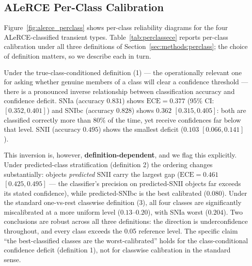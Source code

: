 \subsection{ALeRCE Per-Class Calibration}
\label{sec:results:alerce_perclass}

Figure~\ref{fig:alerce_perclass} shows per-class reliability diagrams
for the four ALeRCE-classified transient types.
Table~\ref{tab:perclassece} reports per-class calibration under all
three definitions of Section~\ref{sec:methods:perclass}; the choice
of definition matters, so we describe each in turn.

Under the true-class-conditioned definition (1) — the operationally
relevant one for asking whether genuine members of a class will clear
a confidence threshold — there is a pronounced inverse relationship
between classification accuracy and confidence deficit. SNIa
(accuracy $0.831$) shows $\mathrm{ECE} = 0.377$
(95\% CI: $[0.352, 0.401]$) and SNIbc (accuracy $0.828$) shows
$0.362$ $[0.315, 0.405]$: both are classified correctly more than
80\% of the time, yet receive confidences far below that level. SNII
(accuracy $0.495$) shows the smallest deficit
($0.103$ $[0.066, 0.141]$).

This inversion is, however, \textbf{definition-dependent}, and we
flag this explicitly. Under predicted-class stratification
(definition 2) the ordering changes substantially: objects
\emph{predicted} SNII carry the largest gap
($\mathrm{ECE} = 0.461$ $[0.425, 0.495]$ — the classifier's precision
on predicted-SNII objects far exceeds its stated confidence), while
predicted-SNIbc is the best calibrated ($0.080$). Under the standard
one-vs-rest classwise definition (3), all four classes are
significantly miscalibrated at a more uniform level
($0.13$--$0.20$), with SNIa worst ($0.204$). Two conclusions are
robust across all three definitions: the direction is
underconfidence throughout, and every class exceeds the 0.05
reference level. The specific claim ``the best-classified classes
are the worst-calibrated'' holds for the class-conditional confidence
deficit (definition 1), not for classwise calibration in the standard
sense.

